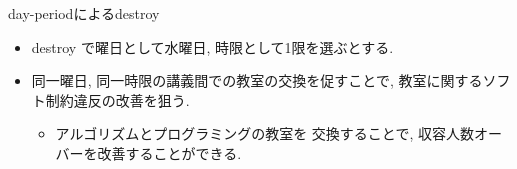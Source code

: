 \documentclass[11pt,dvipdfmx,handout]{beamer}
\begin{document}
\begin{frame}{day-periodによるdestroy}
  \begin{itemize}
   \item \small destroy で曜日として水曜日, 時限として1限を選ぶとする. 
   \item \small 同一曜日, 同一時限の講義間での教室の交換を促すことで, 
   教室に関するソフト制約違反の改善を狙う. 
   \begin{itemize}
    \item アルゴリズムとプログラミングの教室を
    交換することで, 収容人数オーバーを改善することができる. 
   \end{itemize}
  \end{itemize}
\end{frame}
\end{document}
